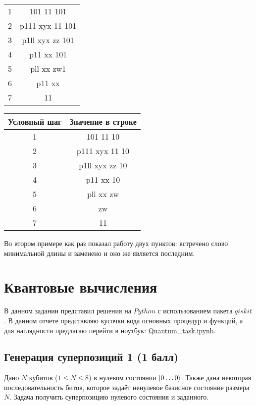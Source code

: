 \documentclass{article}
\begin{document}
\begin{enumerate}
\begin{center}
\begin{tabular}{c|c}
        1   & 101 11 101        \\
        2   & p111 xyx 11 101   \\
        3   & p1ll xyx zz 101   \\
        4   & p11 xx 101        \\
        5   & pll xx zw1        \\
        6   & p11 xx            \\
        7   & 11                \\
    \end{tabular} 
    \begin{tabular}{c|c}
        Условный шаг    & Значение в строке     \\ \hline
        1   & 101 11 10         \\
        2   & p111 xyx 11 10    \\
        3   & p1ll xyx zz 10    \\
        4   & p11 xx 10         \\
        5   & pll xx zw         \\
        6   & zw                \\
        7   & 11                \\
    \end{tabular} 
    \end{center}
    Во втором примере как раз показал работу двух пунктов: встречено слово минимальной длины и заменено и оно же является последним. 
\end{enumerate}
\newpage

\section{Квантовые вычисления}
В данном задании представил решения на $Python$ с использованием пакета $qiskit$. В данном отчете представляю кусочки кода основных процедур и функций, а для наглядности предлагаю перейти в ноутбук: \href{https://github.com/NRU-MPEI-IMAI/tm-and-qc-s3tout/blob/main/Quantum_task.ipynb}{Quantum\_task.ipynb}.
\subsection{Генерация суперпозиций 1 (1 балл)}

Дано $N$ кубитов ($1 \le N \le 8$) в нулевом состоянии $\Ket{0\dots0}$. Также дана некоторая последовательность битов, которое задаёт ненулевое базисное состояние размера $N$. Задача получить суперпозицию нулевого состояния и заданного.
\end{document}
